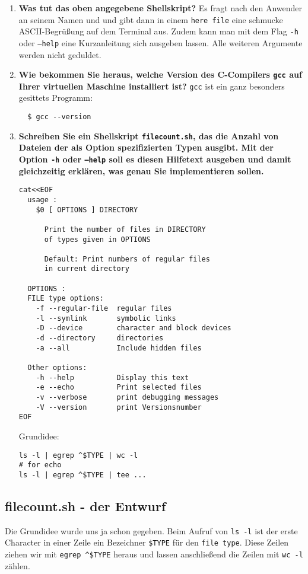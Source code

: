 \documentclass[
   draft=false
  ,paper=a4
  ,twoside=false
  ,fontsize=11pt
  ,headsepline
  ,BCOR10mm
  ,DIV11
  ,parskip=full+
]{scrartcl} %
\begin{document}
\begin{enumerate}
  \item \textbf{Was tut das oben angegebene Shellskript?}\newline
  Es fragt nach den Anwender an seinem Namen und und gibt dann in einem
  \texttt{here file} eine schmucke ASCII-Begrüßung auf dem Terminal aus.
  Zudem kann man mit dem Flag \texttt{-h} oder \texttt{--help} eine
  Kurzanleitung sich ausgeben lassen. Alle weiteren Argumente werden nicht
  geduldet.

  \item \textbf{Wie bekommen Sie heraus, welche Version des C-Compilers
  \texttt{gcc} auf Ihrer virtuellen Maschine installiert ist?}\newline
  \texttt{gcc} ist ein ganz besonders gesittets Programm:
  \begin{verbatim}
  $ gcc --version
  \end{verbatim}

  \item \textbf{Schreiben Sie ein Shellskript \texttt{filecount.sh}, das die
  Anzahl von Dateien der als Option spezifizierten Typen ausgibt. Mit der
  Option \texttt{-h} oder \texttt{--help} soll es diesen Hilfetext ausgeben und
  damit gleichzeitig erklären, was genau Sie implementieren sollen.}
  \begin{verbatim}
cat<<EOF
  usage :
    $0 [ OPTIONS ] DIRECTORY

      Print the number of files in DIRECTORY
      of types given in OPTIONS

      Default: Print numbers of regular files
      in current directory

  OPTIONS :
  FILE type options:
    -f --regular-file  regular files
    -l --symlink       symbolic links
    -D --device        character and block devices
    -d --directory     directories
    -a --all           Include hidden files

  Other options:
    -h --help          Display this text
    -e --echo          Print selected files
    -v --verbose       print debugging messages
    -V --version       print Versionsnumber
EOF
  \end{verbatim}
Grundidee:
\begin{verbatim}
ls -l | egrep ^$TYPE | wc -l
# for echo
ls -l | egrep ^$TYPE | tee ...
\end{verbatim}

\end{enumerate}

\subsection{filecount.sh - der Entwurf}
Die Grundidee wurde uns ja schon gegeben. Beim Aufruf von \texttt{ls -l} ist
der erste Character in einer Zeile ein Bezeichner \texttt{\$TYPE} für den
\texttt{file type}. Diese Zeilen ziehen wir mit \texttt{egrep \^{}\$TYPE}
heraus und lassen anschließend die Zeilen mit \texttt{wc -l} zählen.
\end{document}
